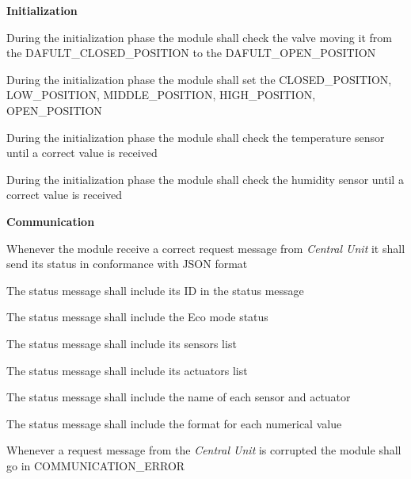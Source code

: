 \begin{req_enum}
	\item \textbf{Initialization}
	\begin{req_enum}[label*=\arabic*.]
		\item During the initialization phase the module shall check the valve moving it from the DAFULT\_CLOSED\_POSITION to the DAFULT\_OPEN\_POSITION
		\item During the initialization phase the module shall set the CLOSED\_POSITION, LOW\_POSITION, MIDDLE\_POSITION, HIGH\_POSITION, OPEN\_POSITION
		\item During the initialization phase the module shall check the temperature sensor until a correct value is received
		\item During the initialization phase the module shall check the humidity sensor until a correct value is received
	\end{req_enum}

	\item \textbf{Communication}
	\begin{req_enum}[label*=\arabic*.]
		\item Whenever the module receive a correct request message from \textit{Central Unit} it shall send its status in conformance with JSON format
		\begin{req_enum}[label*=\arabic*.]
			\item The status message shall include its ID in the status message
			\item The status message shall include the Eco mode status
			\item The status message shall include its sensors list
			\item The status message shall include its actuators list
			\item The status message shall include the name of each sensor and actuator
			\item The status message shall include the format for each numerical value
		\end{req_enum}
		\item Whenever a request message from the \textit{Central Unit} is corrupted the module shall go in COMMUNICATION\_ERROR
	\end{req_enum}


\end{req_enum}
